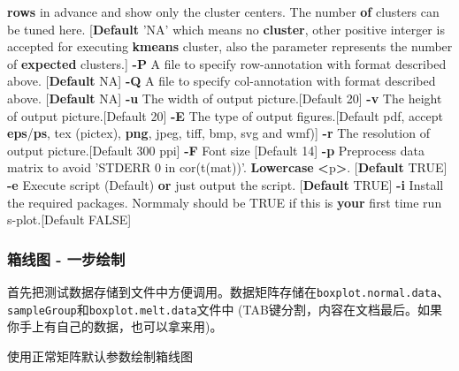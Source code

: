 \documentclass[]{article}
\newenvironment{Shaded}{\begin{snugshade}}{\end{snugshade}}
\newcommand{\KeywordTok}[1]{\textcolor[rgb]{0.13,0.29,0.53}{\textbf{{#1}}}}
\newcommand{\StringTok}[1]{\textcolor[rgb]{0.31,0.60,0.02}{{#1}}}
\newcommand{\NormalTok}[1]{{#1}}
\numberwithin{figure}{section}
\numberwithin{table}{section}
\theoremstyle{definition}
\theoremstyle{definition}
\theoremstyle{definition}
\theoremstyle{remark}
\begin{document}
\begin{Shaded}
\begin{Highlighting}[]
        \KeywordTok{rows} \NormalTok{in advance and show only the cluster centers. The number}
        \KeywordTok{of} \NormalTok{clusters can be tuned here.}
        \NormalTok{[}\KeywordTok{Default} \StringTok{'NA'} \NormalTok{which means no}
        \KeywordTok{cluster}\NormalTok{, other positive interger is accepted for executing}
        \KeywordTok{kmeans} \NormalTok{cluster, also the parameter represents the number of}
        \KeywordTok{expected} \NormalTok{clusters.]}
    \KeywordTok{-P}  \NormalTok{A file to specify row-annotation with format described above.}
        \NormalTok{[}\KeywordTok{Default} \NormalTok{NA]}
    \KeywordTok{-Q}  \NormalTok{A file to specify col-annotation with format described above.}
        \NormalTok{[}\KeywordTok{Default} \NormalTok{NA]}
    \KeywordTok{-u}  \NormalTok{The width of output picture.[Default 20]}
    \KeywordTok{-v}  \NormalTok{The height of output picture.[Default 20] }
    \KeywordTok{-E}  \NormalTok{The type of output figures.[Default pdf, accept}
        \KeywordTok{eps}\NormalTok{/}\KeywordTok{ps}\NormalTok{, tex (pictex), }\KeywordTok{png}\NormalTok{, jpeg, tiff, bmp, svg and wmf)]}
    \KeywordTok{-r}  \NormalTok{The resolution of output picture.[Default 300 ppi]}
    \KeywordTok{-F}  \NormalTok{Font size [Default 14]}
    \KeywordTok{-p}  \NormalTok{Preprocess data matrix to avoid }\StringTok{'STDERR 0 in cor(t(mat))'}\NormalTok{.}
        \KeywordTok{Lowercase} \KeywordTok{<}\NormalTok{p}\KeywordTok{>}\NormalTok{.}
        \NormalTok{[}\KeywordTok{Default} \NormalTok{TRUE]}
    \KeywordTok{-e}  \NormalTok{Execute script (Default) }\KeywordTok{or} \NormalTok{just output the script.}
        \NormalTok{[}\KeywordTok{Default} \NormalTok{TRUE]}
    \KeywordTok{-i}  \NormalTok{Install the required packages. Normmaly should be TRUE if this is }
        \KeywordTok{your} \NormalTok{first time run s-plot.[Default FALSE]}
\end{Highlighting}
\end{Shaded}

\subsubsection{箱线图 - 一步绘制}\label{---}

首先把测试数据存储到文件中方便调用。数据矩阵存储在\texttt{boxplot.normal.data}、\texttt{sampleGroup}和\texttt{boxplot.melt.data}文件中
(TAB键分割，内容在文档最后。如果你手上有自己的数据，也可以拿来用)。

使用正常矩阵默认参数绘制箱线图
\end{document}
